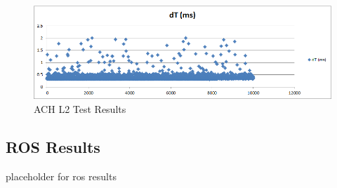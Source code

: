 \begin{figure}[thpb]
 \centering
 \includegraphics[width=1.0\columnwidth]{./images/achtest.png}
  \caption{ACH L2 Test Results}  
  \label{fig:achresults}
\end{figure} 

\subsection{ROS Results}

placeholder for ros results

